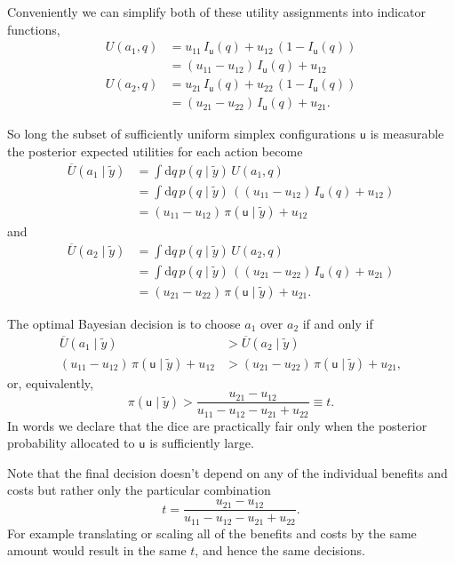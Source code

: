 \documentclass[
  letterpaper,
  DIV=11,
  numbers=noendperiod]{scrartcl}
\begin{document}
Conveniently we can simplify both of these utility assignments into
indicator functions, \begin{align*}
U(a_{1}, q)
&=
u_{11} \, I_{\mathsf{u}}(q) +
u_{12} \, \left( 1 - I_{\mathsf{u}}(q) \right)
\\
&=
(u_{11} - u_{12}) \, I_{\mathsf{u}}(q) + u_{12}
\\
U(a_{2}, q)
&=
u_{21} \, I_{\mathsf{u}}(q) +
u_{22} \, \left( 1 - I_{\mathsf{u}}(q) \right)
\\
&=
(u_{21} - u_{22}) \, I_{\mathsf{u}}(q) + u_{21}.
\end{align*}

So long the subset of sufficiently uniform simplex configurations
\(\mathsf{u}\) is measurable the posterior expected utilities for each
action become \begin{align*}
\overline{U}(a_{1} \mid \tilde{y})
&=
\int \mathrm{d} q \, p(q \mid \tilde{y}) \, U(a_{1}, q)
\\
&=
\int \mathrm{d} q \, p(q \mid \tilde{y}) \,
\left( (u_{11} - u_{12}) \, I_{\mathsf{u}}(q) + u_{12} \right)
\\
&=
(u_{11} - u_{12}) \, \pi( \mathsf{u} \mid \tilde{y}) + u_{12}
\end{align*} and \begin{align*}
\overline{U}(a_{2} \mid \tilde{y})
&=
\int \mathrm{d} q \, p(q \mid \tilde{y}) \, U(a_{2}, q)
\\
&=
\int \mathrm{d} q \, p(q \mid \tilde{y}) \,
\left( (u_{21} - u_{22}) \, I_{\mathsf{u}}(q) + u_{21} \right)
\\
&=
(u_{21} - u_{22}) \, \pi( \mathsf{u} \mid \tilde{y}) + u_{21}.
\end{align*}

The optimal Bayesian decision is to choose \(a_{1}\) over \(a_{2}\) if
and only if \begin{align*}
\overline{U}(a_{1} \mid \tilde{y})
&>
\overline{U}(a_{2} \mid \tilde{y})
\\
(u_{11} - u_{12}) \, \pi( \mathsf{u} \mid \tilde{y}) + u_{12}
&>
(u_{21} - u_{22}) \, \pi( \mathsf{u} \mid \tilde{y}) + u_{21},
\end{align*} or, equivalently, \[
\pi( \mathsf{u} \mid \tilde{y})
>
\frac{ u_{21} - u_{12} }{ u_{11} - u_{12} - u_{21} + u_{22} }
\equiv
t.
\] In words we declare that the dice are practically fair only when the
posterior probability allocated to \(\mathsf{u}\) is sufficiently large.

Note that the final decision doesn't depend on any of the individual
benefits and costs but rather only the particular combination \[
t = \frac{ u_{21} - u_{12} }{ u_{11} - u_{12} - u_{21} + u_{22} }.
\] For example translating or scaling all of the benefits and costs by
the same amount would result in the same \(t\), and hence the same
decisions.
\end{document}
